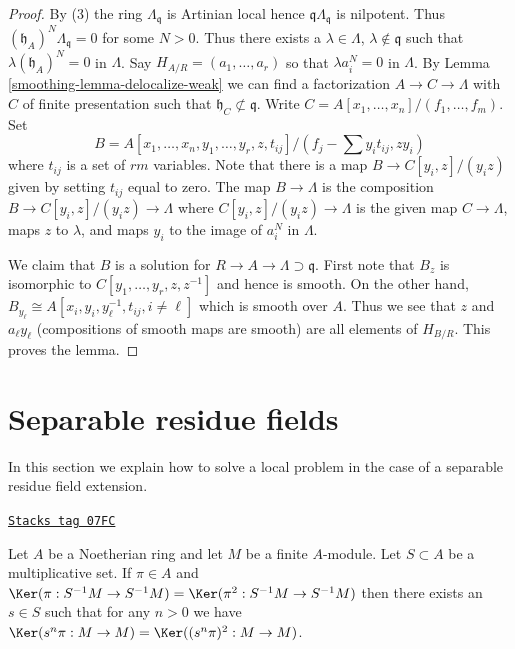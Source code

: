 \begin{proof}

By (3) the ring $\Lambda_\mathfrak q$ is Artinian local hence
$\mathfrak q\Lambda_\mathfrak q$ is nilpotent. Thus
$(\mathfrak h_A)^N \Lambda_\mathfrak q = 0$ for some $N > 0$.
Thus there exists a $\lambda \in \Lambda$, $\lambda \not \in \mathfrak q$
such that $\lambda (\mathfrak h_A)^N = 0$ in $\Lambda$.
Say $H_{A/R} = (a_1, \ldots, a_r)$ so that $\lambda a_i^N = 0$
in $\Lambda$. By Lemma \ref{smoothing-lemma-delocalize-weak} we can find a factorization
$A \to C \to \Lambda$ with $C$ of finite presentation such that
$\mathfrak h_C \not \subset \mathfrak q$.
Write $C = A[x_1, \ldots, x_n]/(f_1, \ldots, f_m)$.
Set
$$
B = A[x_1, \ldots, x_n, y_1, \ldots, y_r, z, t_{ij}]/
(f_j - \sum y_i t_{ij}, zy_i)
$$
where $t_{ij}$ is a set of $rm$ variables.
Note that there is a map $B \to C[y_i, z]/(y_iz)$ given by setting $t_{ij}$
equal to zero. The map $B \to \Lambda$ is the composition
$B \to C[y_i, z]/(y_iz) \to \Lambda$ where $C[y_i, z]/(y_iz) \to \Lambda$
is the given map $C \to \Lambda$, maps $z$ to $\lambda$, and maps
$y_i$ to the image of $a_i^N$ in $\Lambda$.

\medskip\noindent
We claim that $B$ is a solution for $R \to A \to \Lambda \supset \mathfrak q$.
First note that $B_z$ is isomorphic to $C[y_1, \ldots, y_r, z, z^{-1}]$
and hence is smooth. On the other hand,
$B_{y_\ell} \cong A[x_i, y_i, y_\ell^{-1}, t_{ij}, i \not = \ell]$
which is smooth over $A$. Thus we see that $z$ and $a_\ell y_\ell$
(compositions of smooth maps are smooth) are all
elements of $H_{B/R}$. This proves the lemma.
\end{proof}

\section{Separable residue fields}
\label{smoothing-section-separable}
In this section we explain how to solve a local problem in the case
of a separable residue field extension.

\begin{lemma}[Ogoma]

\label{smoothing-lemma-ogoma}
\href{https://stacks.math.columbia.edu/tag/07FC}{\texttt{Stacks tag 07FC}}

Let $A$ be a Noetherian ring and let $M$ be a finite $A$-module.
Let $S \subset A$ be a multiplicative set. If $\pi \in A$ and
$\Ker(\pi : S^{-1}M \to S^{-1}M) =
\Ker(\pi^2 : S^{-1}M \to S^{-1}M)$
then there exists an $s \in S$ such that for any $n > 0$ we have
$\Ker(s^n\pi : M \to M) = \Ker((s^n\pi)^2 : M \to M)$.
\end{lemma}

